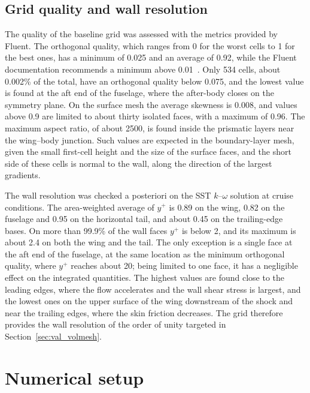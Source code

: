 \subsection{Grid quality and wall resolution}
\label{sec:val_gridquality}
The quality of the baseline grid was assessed with the metrics provided by Fluent. The orthogonal quality, which ranges from 0 for the worst cells to 1 for the best ones, has a minimum of 0.025 and an average of 0.92, while the Fluent documentation recommends a minimum above 0.01~\cite{fluent2024}. Only 534 cells, about 0.002\% of the total, have an orthogonal quality below 0.075, and the lowest value is found at the aft end of the fuselage, where the after-body closes on the symmetry plane. On the surface mesh the average skewness is 0.008, and values above 0.9 are limited to about thirty isolated faces, with a maximum of 0.96. The maximum aspect ratio, of about 2500, is found inside the prismatic layers near the wing--body junction. Such values are expected in the boundary-layer mesh, given the small first-cell height and the size of the surface faces, and the short side of these cells is normal to the wall, along the direction of the largest gradients.

The wall resolution was checked a posteriori on the SST $k$--$\omega$ solution at cruise conditions. The area-weighted average of $y^+$ is 0.89 on the wing, 0.82 on the fuselage and 0.95 on the horizontal tail, and about 0.45 on the trailing-edge bases. On more than 99.9\% of the wall faces $y^+$ is below 2, and its maximum is about 2.4 on both the wing and the tail. The only exception is a single face at the aft end of the fuselage, at the same location as the minimum orthogonal quality, where $y^+$ reaches about 20; being limited to one face, it has a negligible effect on the integrated quantities. The highest values are found close to the leading edges, where the flow accelerates and the wall shear stress is largest, and the lowest ones on the upper surface of the wing downstream of the shock and near the trailing edges, where the skin friction decreases. The grid therefore provides the wall resolution of the order of unity targeted in Section~\ref{sec:val_volmesh}.


\section{Numerical setup}
\label{sec:val_setup}

